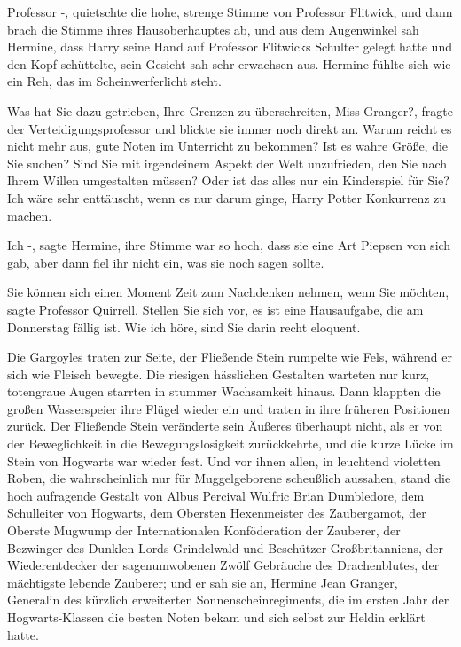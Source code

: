 \glqq Professor -\grqq{}, quietschte die hohe, strenge Stimme von Professor
Flitwick, und dann brach die Stimme ihres Hausoberhauptes ab, und aus dem
Augenwinkel sah Hermine, dass Harry seine Hand auf Professor Flitwicks Schulter
gelegt hatte und den Kopf schüttelte, sein Gesicht sah sehr erwachsen aus.
Hermine fühlte sich wie ein Reh, das im Scheinwerferlicht steht.

\glqq Was hat Sie dazu getrieben, Ihre Grenzen zu überschreiten, Miss
Granger?\grqq{}, fragte der Verteidigungsprofessor und blickte sie immer noch
direkt an. \glqq Warum reicht es nicht mehr aus, gute Noten im Unterricht zu
bekommen? Ist es wahre Größe, die Sie suchen? Sind Sie mit irgendeinem Aspekt
der Welt unzufrieden, den Sie nach Ihrem Willen umgestalten müssen? Oder ist das
alles nur ein Kinderspiel für Sie? Ich wäre sehr enttäuscht, wenn es nur darum
ginge, Harry Potter Konkurrenz zu machen.\grqq{}

\glqq Ich -\grqq{}, sagte Hermine, ihre Stimme war so hoch, dass sie eine Art
Piepsen von sich gab, aber dann fiel ihr nicht ein, was sie noch sagen sollte.

\glqq Sie können sich einen Moment Zeit zum Nachdenken nehmen, wenn Sie
möchten\grqq{}, sagte Professor Quirrell. \glqq Stellen Sie sich vor, es ist
eine Hausaufgabe, die am Donnerstag fällig ist. Wie ich höre, sind Sie darin
recht eloquent.\grqq{}

Die Gargoyles traten zur Seite, der Fließende Stein rumpelte wie Fels, während
er sich wie Fleisch bewegte. Die riesigen hässlichen Gestalten warteten nur
kurz, totengraue Augen starrten in stummer Wachsamkeit hinaus. Dann klappten die
großen Wasserspeier ihre Flügel wieder ein und traten in ihre früheren
Positionen zurück. Der Fließende Stein veränderte sein Äußeres überhaupt nicht,
als er von der Beweglichkeit in die Bewegungslosigkeit zurückkehrte, und die
kurze Lücke im Stein von Hogwarts war wieder fest. Und vor ihnen allen, in
leuchtend violetten Roben, die wahrscheinlich nur für Muggelgeborene scheußlich
aussahen, stand die hoch aufragende Gestalt von Albus Percival Wulfric Brian
Dumbledore, dem Schulleiter von Hogwarts, dem Obersten Hexenmeister des
Zaubergamot, der Oberste Mugwump der Internationalen Konföderation der Zauberer,
der Bezwinger des Dunklen Lords Grindelwald und Beschützer Großbritanniens, der
Wiederentdecker der sagenumwobenen Zwölf Gebräuche des Drachenblutes, der
mächtigste lebende Zauberer; und er sah sie an, Hermine Jean Granger, Generalin
des kürzlich erweiterten Sonnenscheinregiments, die im ersten Jahr der
Hogwarts-Klassen die besten Noten bekam und sich selbst zur Heldin erklärt
hatte.

